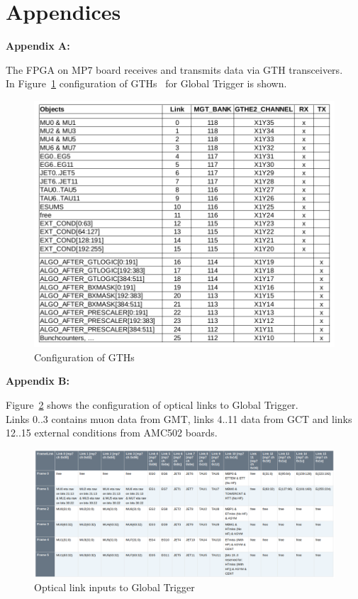 \section{Appendices}\label{sec:app:app}

\textbf{Appendix A:}

The FPGA on MP7 board receives and transmits data via GTH transceivers.\\
In Figure~\ref{fig:app:gth_conf} configuration of GTHs~\cite{GTHs} for Global Trigger is shown.

\begin{figure}[htb]
\centering
\includegraphics[width=15cm]{figures/gth_xc7v690t_ffg1927}
\caption{Configuration of GTHs}
\label{fig:app:gth_conf}
\end{figure}

\clearpage

\textbf{Appendix B:}

Figure~\ref{fig:app:ugt_inputs} shows the configuration of optical links to Global Trigger.\\
Links 0..3 contains muon data from GMT, links 4..11 data from GCT and links 12..15 external conditions
from AMC502 boards.

\begin{figure}[htb]
\centering
\includegraphics[width=15cm]{figures/ugt_inputs}
\caption{Optical link inputs to Global Trigger}
\label{fig:app:ugt_inputs}
\end{figure}


